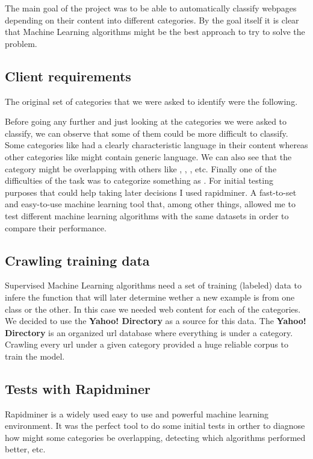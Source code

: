 
The main goal of the project was to be able to automatically classify webpages depending on their content into different categories. 
By the goal itself it is clear that Machine Learning algorithms might be the best approach to try to solve the problem. 

\subsection{Client requirements}

The original set of categories that we were asked to identify were the following.


Before going any further and just looking at the categories we were asked to classify, we can observe that some of them could be more difficult to classify.
Some categories like  had a clearly characteristic language in their content whereas other categories like  might contain generic language.
We can also see that the category  might be overlapping with others like , , , etc. 
Finally one of the difficulties of the task was to categorize something as . 
For initial testing purposes that could help taking later decisions I used rapidminer. A fast-to-set and easy-to-use machine learning tool that, among other things, allowed me to test different
machine learning algorithms with the same datasets in order to compare their performance.

\subsection{Crawling training data}
Supervised Machine Learning algorithms need a set of training (labeled) data to infere the function that will later determine wether a new example is from one class or the other. In this case we needed
web content for each of the categories. We decided to use the {\bf Yahoo! Directory}\cite{yahoo} as a source for this data.
The {\bf Yahoo! Directory} is an organized url database where everything is under a category. Crawling every url under a given category provided a huge reliable corpus to train the model.

  


\subsection{Tests with Rapidminer}
Rapidminer\cite{rapidminer} is a widely used easy to use and powerful machine learning environment.  
It was the perfect tool to do some initial tests in orther to diagnose how might some categories be overlapping, detecting which algorithms performed better, etc.



